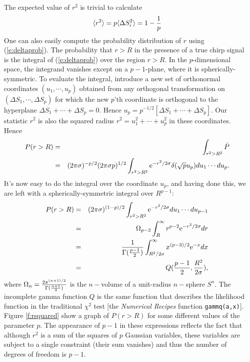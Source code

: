 The expected value of $r^2$ is trivial to calculate
\begin{equation}
\langle r^2 \rangle = p \langle \Delta S_i^2 \rangle = 1 - {1 \over p}
\end{equation}
One can also easily compute the probability distribution of $r$ using
(\ref{e:deltaprob}).  The probability that $r>R$ in the presence of a
true chirp signal is the integral of (\ref{e:deltaprob}) over the region
$r>R$.  In the $p$-dimensional space, the integrand vanishes except on a
$p-1$-plane, where it is spherically-symmetric.  To evaluate the integral,
introduce a new set of orthonormal coordinates $(u_1,\cdots,u_p)$ obtained
from any orthogonal transformation on $(\Delta S_1,\cdots,\Delta S_p)$
for which the new $p$'th coordinate is orthogonal to the hyperplane
$\Delta S_1 + \cdots +\Delta S_p = 0$.  Hence $u_p = p^{-1/2} \left[
\Delta S_1 + \cdots +\Delta S_p \right]$. Our statistic $r^2$ is also the
squared radius $r^2 = u_1^2 + \cdots + u_p^2$ in these coordinates.  Hence
\begin{eqnarray}
\nonumber
P(r>R) &=& \int_{r^2 > R^2} \bar P \\
 & = & (2 \pi \sigma)^{-p/2} (2 \pi \sigma p)^{1/2} \int_{r^2 > R^2} 
     {\rm e}^{-r^2/2\sigma} \delta(\sqrt{p} u_p) du_1 \cdots du_p.
\end{eqnarray}
It's now easy to do the integral over the coordinate $u_p$, and having done this,
we are left with a spherically-symmetric integral over $R^{p-1}$:
\begin{eqnarray}
\nonumber
P(r>R) & = & (2 \pi \sigma)^{(1-p)/2}  \int_{r^2 > R^2} 
     {\rm e}^{-r^2/2\sigma}  du_1 \cdots du_{p-1} \\
\nonumber
    & = &   \Omega_{p-2} \int_R^\infty r^{p-2} {\rm e}^{-r^2/2\sigma} dr \\
\nonumber
& = & {1 \over \Gamma({p-1 \over 2}) } \int_{R^2/2 \sigma}^\infty x^{(p-3)/2} {\rm e}^{-x} dx \\
& = & Q(  {p-1 \over 2}  ,{ R^2 \over 2 \sigma}),
\end{eqnarray}
where $\Omega_{n} = {2 \pi^{(n+1)/2} \over \Gamma({n+1 \over 2})}$
is the $n-$volume of a unit-radius $n-$sphere $S^n$.  The incomplete
gamma function $Q$ is the same function that describes the likelihood
function in the traditional $\chi^2$ test [the {\it Numerical
Recipes} function {\tt gammq(a,x)}].  Figure \ref{f:rsquared}
show a graph of $P(r>R)$ for some different values of the parameter $p$.
The appearance of $p-1$ in these expressions reflects the fact that
although $r^2$ is a sum of the squares of $p$ Gaussian variables, these
variables are subject to a single constraint (their sum vanishes) and
thus the number of degrees of freedom is $p-1$.

